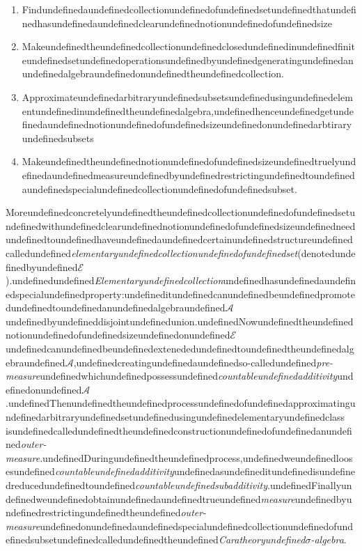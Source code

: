 \begin{enumerate}
\item Findundefinedaundefinedcollectionundefinedofundefinedsetundefinedthatundefinedhasundefinedaundefinedclearundefinednotionundefinedofundefinedsize
\item Makeundefinedtheundefinedcollectionundefinedclosedundefinedinundefinedfiniteundefinedsetundefinedoperationsundefinedbyundefinedgeneratingundefinedanundefinedalgebraundefinedonundefinedtheundefinedcollection.
\item Approximateundefinedarbitraryundefinedsubsetsundefinedusingundefinedelementundefinedinundefinedtheundefinedalgebra,undefinedhenceundefinedgetundefinedaundefinednotionundefinedofundefinedsizeundefinedonundefinedarbtiraryundefinedsubsets
\item Makeundefinedtheundefinednotionundefinedofundefinedsizeundefinedtruelyundefinedaundefinedmeasureundefinedbyundefinedrestrictingundefinedtoundefinedaundefinedspecialundefinedcollectionundefinedofundefinedsubset.
\end{enumerate}

Moreundefinedconcretelyundefinedtheundefinedcollectionundefinedofundefinedsetundefinedwithundefinedclearundefinednotionundefinedofundefinedsizeundefinedneedundefinedtoundefinedhaveundefinedaundefinedcertainundefinedstructureundefinedcalledundefined\textit{elementaryundefinedcollectionundefinedofundefinedset}(denotedundefinedbyundefined$\mathcal E$).undefinedundefined\textit{Elementaryundefinedcollection}undefinedhasundefinedaundefinedspecialundefinedproperty:undefineditundefinedcanundefinedbeundefinedpromotedundefinedtoundefinedanundefinedalgebraundefined$\mathcal A$undefinedbyundefineddisjointundefinedunion.undefinedNowundefinedtheundefinednotionundefinedofundefinedsizeundefinedonundefined$\mathcal E$undefinedcanundefinedbeundefinedextenededundefinedtoundefinedtheundefinedalgebraundefined$\mathcal A$,undefinedcreatingundefinedaundefinedso-calledundefined\textit{pre-measure}undefinedwhichundefinedpossessundefined\textit{countableundefinedadditivity}undefinedonundefined$\mathcal A$.undefinedThenundefinedtheundefinedprocessundefinedofundefinedapproximatingundefinedarbitraryundefinedsetundefinedusingundefinedelementaryundefinedclass
isundefinedcalledundefinedtheundefinedconstructionundefinedofundefinedanundefined\textit{outer-measure}.undefinedDuringundefinedtheundefinedprocess,undefinedweundefinedloosesundefined\textit{countableundefinedadditivity}undefinedasundefineditundefinedisundefinedreducedundefinedtoundefined\textit{countableundefinedsubadditivity}.undefinedFinallyundefinedweundefinedobtainundefinedaundefinedtrueundefined\textit{measure}undefinedbyundefinedrestrictingundefinedtheundefined\textit{outer-measure}undefinedonundefinedaundefinedspecialundefinedcollectionundefinedofundefinedsubsetundefinedcalledundefinedtheundefined\textit{Caratheoryundefined$\sigma$-algebra}.

